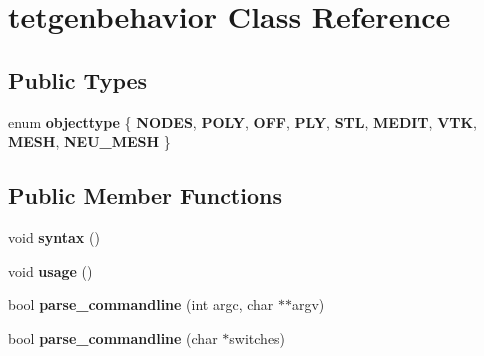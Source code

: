 \hypertarget{classtetgenbehavior}{}\section{tetgenbehavior Class Reference}
\label{classtetgenbehavior}
\subsection*{Public Types}
\begin{DoxyCompactItemize}
\item 
\mbox{\label{classtetgenbehavior_aeea08e7334fde4251b74a8247bcc54b8}} 
enum {\bfseries objecttype} \{ \newline
{\bfseries N\+O\+D\+ES}, 
{\bfseries P\+O\+LY}, 
{\bfseries O\+FF}, 
{\bfseries P\+LY}, 
\newline
{\bfseries S\+TL}, 
{\bfseries M\+E\+D\+IT}, 
{\bfseries V\+TK}, 
{\bfseries M\+E\+SH}, 
\newline
{\bfseries N\+E\+U\+\_\+\+M\+E\+SH}
 \}
\end{DoxyCompactItemize}
\subsection*{Public Member Functions}
\begin{DoxyCompactItemize}
\item 
\mbox{\label{classtetgenbehavior_a6e22cb6ec468a3b0a5fc45fcb4d9709c}} 
void {\bfseries syntax} ()
\item 
\mbox{\label{classtetgenbehavior_aa0bf59fe9ca35269d58e5f1ee10aca05}} 
void {\bfseries usage} ()
\item 
\mbox{\label{classtetgenbehavior_a240b6eb4bee021fc945ca8b01f7b7b9f}} 
bool {\bfseries parse\+\_\+commandline} (int argc, char $\ast$$\ast$argv)
\item 
\mbox{\label{classtetgenbehavior_abf5ad80b5b6900296253c6126f667fe2}} 
bool {\bfseries parse\+\_\+commandline} (char $\ast$switches)
\end{DoxyCompactItemize}

